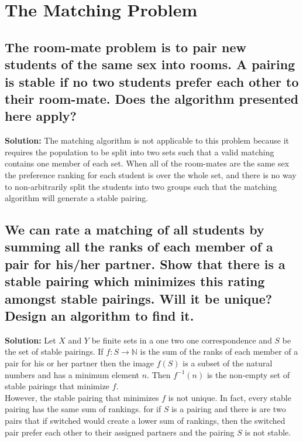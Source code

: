 \documentclass{article}
\newcommand{\exercise}[1]{\subsection{\normalfont #1}}
\newcommand{\solution}{\indent\indent \textbf{Solution: }}
\begin{document}
\newpage
\section{The Matching Problem}
 \exercise{The room-mate problem is to pair new students of the same sex into rooms. A pairing is stable if no two students prefer each other to their room-mate. Does the algorithm presented here apply?} %
 \solution The matching algorithm is not applicable to this problem because it requires the population to be split into two sets such that a valid matching contains one member of each set. When all of the room-mates are the same sex the preference ranking for each student is over the whole set, and there is no way to non-arbitrarily split the students into two groups such that the matching algorithm will generate a stable pairing. 
 
 \exercise{We can rate a matching of all students by summing all the ranks of each member of a pair for his/her partner. Show that there is a stable pairing which minimizes this rating amongst stable pairings. Will it be unique? Design an algorithm to find it.} %
 \solution Let $X$ and $Y$ be finite sets in a one two one correspondence and $S$ be the set of stable pairings. If $f\colon S\to \mathbb{N}$ is the sum of the ranks of each member of a pair for his or her partner then the image $f(S)$ is a subset of the natural numbers and has a minimum element $n$. Then $f^{-1}(n)$ is the non-empty set of stable pairings that minimize $f$. \\
 \indent However, the stable pairing that minimizes $f$ is not unique. In fact, every stable pairing has the same sum of rankings. for if $S$ is a pairing and there is are two pairs that if switched would create a lower sum of rankings, then the switched pair prefer each other to their assigned partners and the pairing $S$ is not stable.  
 
 \newpage
\end{document}
